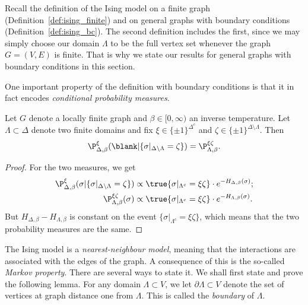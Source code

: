 Recall the definition of the Ising model on a finite graph
(Definition~\ref{def:ising_finite})
and on general graphs with boundary conditions (Definition~\ref{def:ising_bc}).
The second definition includes the first, since we may simply 
choose our domain $\Lambda$ to be the full vertex set whenever the
graph $G=(V,E)$ is finite.
That is why we state our results for general graphs with boundary conditions
in this section.

One important property of the definition with boundary conditions is that
it in fact encodes \emph{conditional probability measures}.

\begin{lemma}
    \label{lemma:boundary_conditions_conditional_measures}
    Let $G$ denote a locally finite graph and $\beta\in[0,\infty)$
    an inverse temperature.
    Let $\Lambda\subset\Delta$ denote two finite domains
    and fix $\xi\in\{\pm1\}^{\Delta^c}$
    and $\zeta\in\{\pm1\}^{\Delta\setminus\Lambda}$.
    Then
    \[
        \P_{\Delta,\beta}^\xi(\blank|\{\sigma|_{\Delta\setminus\Lambda}=\zeta\})
        =
        \P_{\Lambda,\beta}^{\xi\zeta}.
    \]
\end{lemma}

\begin{proof}
    For the two measures, we get
    \begin{align}
        \P_{\Delta,\beta}^\xi(\sigma|\{\sigma|_{\Delta\setminus\Lambda}=\zeta\})
        &\propto\true{\sigma|_{\Lambda^c}=\xi\zeta}\cdot e^{-H_{\Delta,\beta}(\sigma)};
        \\\P_{\Lambda,\beta}^{\xi\zeta}(\sigma)
        &\propto\true{\sigma|_{\Lambda^c}=\xi\zeta}\cdot e^{-H_{\Lambda,\beta}(\sigma)}.
    \end{align}
    But $H_{\Delta,\beta}-H_{\Lambda,\beta}$ is constant on the
    event $\{\sigma|_{\Lambda^c}=\xi\zeta\}$,
    which means that the two probability measures are the same.
\end{proof}

The Ising model is a \emph{nearest-neighbour model},
meaning that the interactions are associated with the edges of the graph.
A consequence of this is the so-called \emph{Markov property}.
There are several ways to state it.
We shall first state and prove the following lemma.
For any domain $\Lambda\subset V$,
we let $\partial\Lambda\subset V$ denote the set of vertices
at graph distance one from $\Lambda$.
This is called the \emph{boundary} of $\Lambda$.

